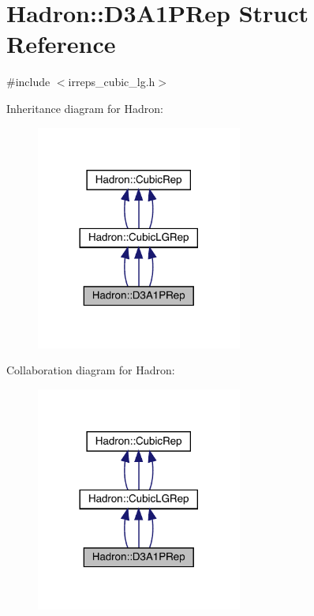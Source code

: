\hypertarget{structHadron_1_1D3A1PRep}{}\section{Hadron\+:\+:D3\+A1\+P\+Rep Struct Reference}
\label{structHadron_1_1D3A1PRep}


{\ttfamily \#include $<$irreps\+\_\+cubic\+\_\+lg.\+h$>$}



Inheritance diagram for Hadron\+:
\nopagebreak
\begin{figure}[H]
\begin{center}
\leavevmode
\includegraphics[width=192pt]{d0/d3f/structHadron_1_1D3A1PRep__inherit__graph}
\end{center}
\end{figure}


Collaboration diagram for Hadron\+:
\nopagebreak
\begin{figure}[H]
\begin{center}
\leavevmode
\includegraphics[width=192pt]{de/da2/structHadron_1_1D3A1PRep__coll__graph}
\end{center}
\end{figure}
